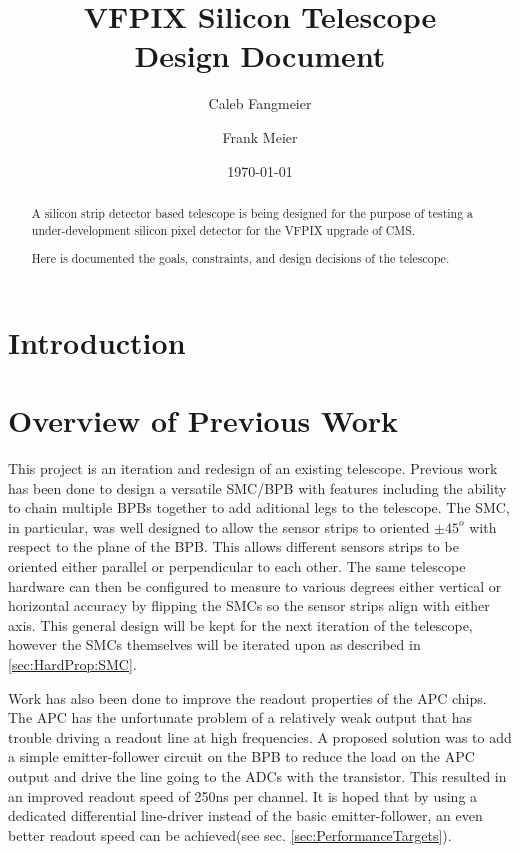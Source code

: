 \documentclass{article}
\begin{document}
\title{VFPIX Silicon Telescope \\ Design Document}
\author{Caleb Fangmeier}
\author{Frank Meier}

\date{\today}


\maketitle

\begin{abstract}
  A silicon strip detector based telescope is being designed for the purpose of testing a under-development silicon pixel detector for the VFPIX upgrade of CMS.

  Here is documented the goals, constraints, and design decisions of the telescope.
\end{abstract}

\listoftodos

\newpage

\tableofcontents

\newpage

\section{Introduction}

\section{Overview of Previous Work}
\label{sec:PreviousWork}
This project is an iteration and redesign of an existing telescope. Previous work\cite{Turner2012} has been done to design a versatile \gls{SMC}/\gls{BPB} with features including the ability to chain multiple \gls{BPB}s together to add aditional legs to the telescope. The \gls{SMC}, in particular, was well designed to allow the sensor strips to oriented $\pm45^o$ with respect to the plane of the BPB. This allows different sensors strips to be oriented either parallel or perpendicular to each other. The same telescope hardware can then be configured to measure to various degrees either vertical or horizontal accuracy by flipping the \gls{SMC}s so the sensor strips align with either axis. This general design will be kept for the next iteration of the telescope, however the \gls{SMC}s themselves will be iterated upon as described in \ref{sec:HardProp:SMC}.

Work has also been done to improve the readout properties of the \gls{APC} chips.\cite{Ryser2013} The \gls{APC} has the unfortunate problem of a relatively weak output that has trouble driving a readout line at high frequencies. A proposed solution was to add a simple emitter-follower circuit on the BPB to reduce the load on the \gls{APC} output and drive the line going to the ADCs with the transistor. This resulted in an improved readout speed of 250ns per channel. It is hoped that by using a dedicated differential line-driver instead of the basic emitter-follower, an even better readout speed can be achieved(see sec. \ref{sec:PerformanceTargets}). 
\end{document}
